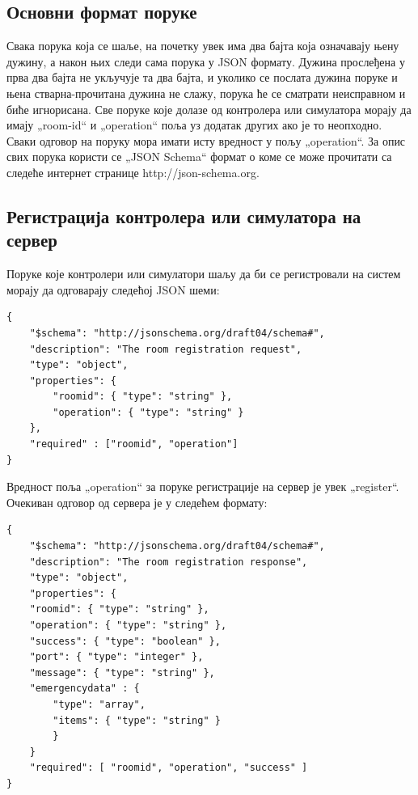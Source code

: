 \documentclass[a4paper, 12pt, diplomski]{etfcyr}
\def\quote#1{„#1“}
\begin{document}
			\subsection{Основни формат поруке}
				\begin{justify}
					Свака порука која се шаље, на почетку увек има два бајта која означавају њену дужину, а након њих следи сама порука у JSON формату. Дужина прослеђена у прва два бајта не укључује та два бајта, и уколико се послата дужина поруке и њена стварна-прочитана дужина не слажу, порука ће се сматрати неисправном и биће игнорисана. Све поруке које долазе од контролера или симулатора морају да имају \quote{room-id} и \quote{operation} поља уз додатак других ако је то неопходно. Сваки одговор на поруку мора имати исту вредност у пољу \quote{operation}.
					За опис свих порука користи се \quote{JSON Schema} формат о коме се може прочитати са следеће интернет странице http://json-schema.org.
				\end{justify}

			\newpage

			\subsection{Регистрација контролера или симулатора на сервер}
				\begin{justify}
					Поруке које контролери или симулатори шаљу да би се регистровали на систем морају да одговарају следећој JSON шеми:
					\begin{lstlisting}
{
	"$schema": "http://json­schema.org/draft­04/schema#",
	"description": "The room registration request",
	"type": "object",
	"properties": {
		"room­id": { "type": "string" },
		"operation": { "type": "string" }
	},
	"required" : ["room­id", "operation"]
}
					\end{lstlisting}
					Вредност поља \quote{operation} за поруке регистрације на сервер је увек \quote{register}.
					Очекиван одговор од сервера је у следећем формату:
					\begin{lstlisting}
{
	"$schema": "http://json­schema.org/draft­04/schema#",
	"description": "The room registration response",
	"type": "object",
	"properties": {
	"room­id": { "type": "string" },
	"operation": { "type": "string" },
	"success": { "type": "boolean" },
	"port": { "type": "integer" },
	"message": { "type": "string" },
	"emergency­data" : {
		"type": "array",
		"items": { "type": "string" }
		}
	}
	"required": [ "room­id", "operation", "success" ]
}
					\end{lstlisting}
				\end{justify}
\end{document}
